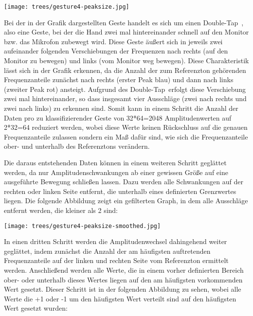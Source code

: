 \begin{center}
  \texttt{[image: trees/gesture4-peaksize.jpg]}
\end{center}

Bei der in der Grafik dargestellten Geste handelt es sich um einen \glqq Double-Tap\grqq\ , also eine Geste, bei der die Hand zwei mal 
hintereinander schnell auf den Monitor bzw. das Mikrofon zubewegt wird. Diese Geste äußert sich in jeweils zwei aufeinander folgenden 
Verschiebungen der Frequenzen nach rechts (auf den Monitor zu bewegen) und links (vom Monitor weg bewegen). 
Diese Charakteristik lässt sich in der Grafik erkennen, da die Anzahl der zum Referenzton gehörenden Frequenzanteile zunächst nach rechts (erster Peak blau) und dann nach links (zweiter Peak rot) ansteigt. Aufgrund des \glqq Double-Tap\grqq\  erfolgt diese 
Verschiebung zwei mal hintereinander, so dass insgesamt vier Ausschläge (zwei nach rechts und zwei nach links) zu erkennen sind. 
Somit kann in einem Schritt die Anzahl der Daten pro zu klassifizierender Geste von 32*64=2048 Amplitudenwerten 
auf 2*32=64 reduziert werden, wobei diese Werte keinen Rückschluss auf die genauen Frequenzanteile zulassen sondern 
ein Maß dafür sind, wie sich die Frequenzanteile ober- und unterhalb des Referenztons verändern.

Die daraus entstehenden Daten können in einem weiteren Schritt geglättet werden, da nur Amplitudenschwankungen ab einer gewissen 
Größe auf eine ausgeführte Bewegung schließen lassen. Dazu werden alle Schwankungen auf der rechten oder linken Seite entfernt, 
die unterhalb eines definierten Grenzwertes liegen. 
Die folgende Abbildung zeigt ein gefilterten Graph, in dem alle Ausschläge entfernt werden, die kleiner als 2 sind:

\begin{center}
  \texttt{[image: trees/gesture4-peaksize-smoothed.jpg]}
\end{center}

In einen dritten Schritt werden die Amplitudenwechsel dahingehend weiter geglättet, indem zunächst die Anzahl der am häufigsten 
auftretenden Frequenzanteile auf der linken und rechten Seite vom Referenzton ermittelt werden. Anschließend werden alle Werte,
die in einem vorher definierten Bereich ober- oder unterhalb dieses Wertes liegen auf den am häufigsten vorkommenden Wert gesetzt.
Dieser Schritt ist in der folgenden Abbildung zu sehen, wobei alle Werte die +1 oder -1 um den häufigsten Wert verteilt sind 
auf den häufigsten Wert gesetzt wurden:

